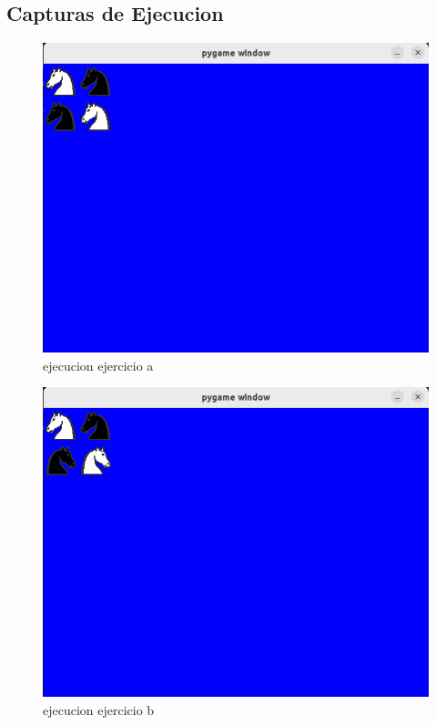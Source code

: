 \documentclass{article}
\begin{document}
\subsection{Capturas de Ejecucion}
\begin{figure}[H]
    \centering
    \includegraphics[scale=0.3]{img/capturaEjercicio2a.png}
    \caption{ejecucion ejercicio a}
\end{figure}
\begin{figure}[H]
    \centering
    \includegraphics[scale=0.3]{img/capturaEjercicio2b.png}
    \caption{ejecucion ejercicio b}
\end{figure}
\end{document}
